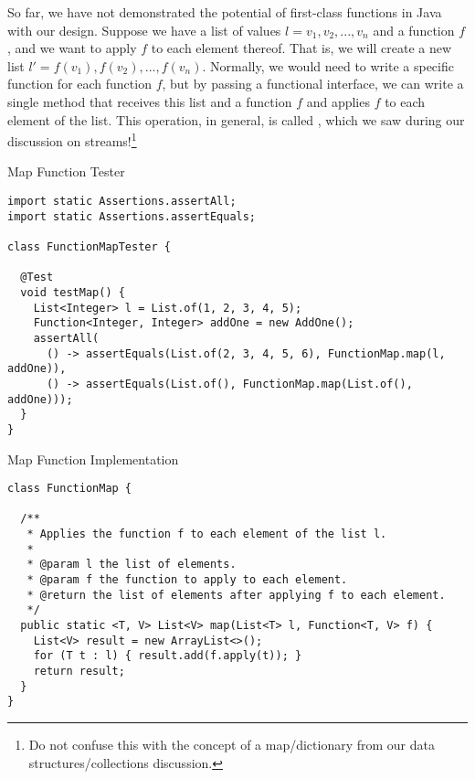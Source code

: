 So far, we have not demonstrated the potential of first-class functions in Java with our design. Suppose we have a list of  values $l=v_1, v_2, ..., v_n$ and a function $f$, and we want to apply $f$ to each element thereof. That is, we will create a new list $l'=f(v_1), f(v_2), ..., f(v_n)$. Normally, we would need to write a specific function for each function $f$, but by passing a functional interface, we can write a single method that receives this list and a function $f$ and applies $f$ to each element of the list. This operation, in general, is called , which we saw during our discussion on streams!\footnote{Do not confuse this with the concept of a map/dictionary from our data structures/collections discussion.}

\begin{cl}{Map Function Tester}
\begin{lstlisting}[language=MyJava]
import static Assertions.assertAll;
import static Assertions.assertEquals;

class FunctionMapTester {

  @Test
  void testMap() {
    List<Integer> l = List.of(1, 2, 3, 4, 5);
    Function<Integer, Integer> addOne = new AddOne();
    assertAll(
      () -> assertEquals(List.of(2, 3, 4, 5, 6), FunctionMap.map(l, addOne)),
      () -> assertEquals(List.of(), FunctionMap.map(List.of(), addOne)));
  }
}
\end{lstlisting}
\end{cl}

\begin{cl}{Map Function Implementation}
\begin{lstlisting}[language=MyJava]
class FunctionMap {

  /**
   * Applies the function f to each element of the list l.
   * 
   * @param l the list of elements.
   * @param f the function to apply to each element.
   * @return the list of elements after applying f to each element.
   */
  public static <T, V> List<V> map(List<T> l, Function<T, V> f) {
    List<V> result = new ArrayList<>();
    for (T t : l) { result.add(f.apply(t)); }
    return result;
  }
}
\end{lstlisting}
\end{cl}


